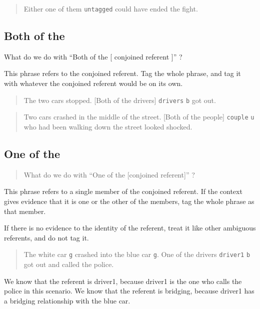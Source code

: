 \documentclass[
]{book}
\begin{document}
\begin{quote}
Either one of them \texttt{untagged} could have ended the fight.
\end{quote}

\hypertarget{both-of-the}{%
\subsection{Both of the}\label{both-of-the}}

What do we do with ``Both of the {[} conjoined referent {]}'' ?

This phrase refers to the conjoined referent. Tag the whole phrase, and tag it with whatever the conjoined referent would be on its own.

\begin{quote}
The two cars stopped.
{[}Both of the drivers{]} \texttt{drivers} \texttt{b} got out.
\end{quote}

\begin{quote}
Two cars crashed in the middle of the street.
{[}Both of the people{]} \texttt{couple} \texttt{u} who had been walking down the street looked shocked.
\end{quote}

\hypertarget{one-of-the}{%
\subsection{One of the}\label{one-of-the}}

\begin{quote}
What do we do with ``One of the {[}conjoined referent{]}'' ?
\end{quote}

This phrase refers to a single member of the conjoined referent.
If the context gives evidence that it is one or the other of the members, tag the whole phrase as that member.

If there is no evidence to the identity of the referent, treat it like other ambiguous referents, and do not tag it.

\begin{quote}
The white car \texttt{g} crashed into the blue car \texttt{g}.
One of the drivers \texttt{driver1} \texttt{b} got out and called the police.
\end{quote}

We know that the referent is driver1, because driver1 is the one who calls the police in this scenario.
We know that the referent is bridging, because driver1 has a bridging relationship with the blue car.
\end{document}
